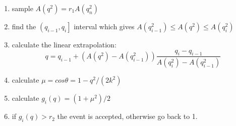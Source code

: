 \begin{enumerate}
\item sample $ A \left( q^2 \right) = r_1 A \left( q_n^2 \right) $
\item find the $ \left (  q_{i-1} , q_i  \right] $ interval
which gives $ A \left( q_{i-1}^2 \right) \leq A \left( q^2 \right)
\leq  A \left( q_i^2 \right) $
\item calculate the linear extrapolation:
\begin{equation}
q = q_{i-1} + \left( A \left( q^2 \right) -  A \left( q_{i-1}^2 \right) \right)
\frac{q_i - q_{i-1} }
{ A \left( q_i^2 \right) -  A \left( q_{i-1}^2 \right)} \nonumber
\end{equation}
\item calculate $\mu = cos \theta  = 1 - q^2/(2 k^2) $
\item calculate $g_i \left( q \right) = (1 + \mu^2 )/2 $
\item if $g_i \left( q \right) > r_2 $ the event is accepted, otherwise
go back to 1.
\end{enumerate}
